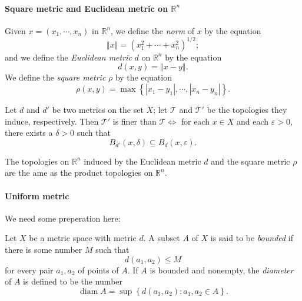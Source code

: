 \paragraph{Square metric and Euclidean metric on \( \mathbb{R}^n \)}

\begin{definition}
  Given \( x = (x_1, \cdots, x_n) \) in \( \mathbb{R}^n \), we define the \emph{norm} of \( x \) by the equation
  \[
    \left\Vert x \right\Vert = (x_1^2 + \cdots + x^2_n)^{1/2};
  \]
  and we define the \emph{Euclidean metric} \( d \) on \( \mathbb{R}^n \) by the equation
  \[
    d(x, y) = \left\Vert x - y \right\Vert.
  \]
  We define the \emph{square metric} \( \rho \) by the equation
  \[
    \rho(x, y) = \max \left\lbrace \left\vert x_1 - y_1 \right\vert, \cdots, \left\vert x_n - y_n \right\vert \right\rbrace.
  \]
\end{definition}

\begin{lemma}
  Let \( d \) and \( d' \) be two metrics on the set \( X \); let \( \mathcal{T} \) and \( \mathcal{T}' \) be the topologies they induce, respectively.
  Then \( \mathcal{T}' \) is finer than \( \mathcal{T} \iff \) for each \( x \in X \) and each \( \varepsilon > 0 \), there exists a \( \delta > 0 \) such that
  \[
    B_{d'}(x, \delta) \subseteq B_d(x, \varepsilon).
  \]
\end{lemma}

\begin{theorem}
  The topologies on \( \mathbb{R}^n \) induced by the Euclidean metric \( d \) and the square metric \( \rho \) are the ame as the product topologies on \( \mathbb{R}^n \).
\end{theorem}

\paragraph{Uniform metric}

We need some preperation here:

\begin{definition}
  Let \( X \) be a metric space with metric \( d \).
  A subset \( A \) of \( X \) is said to be \emph{bounded} if there is some number \( M \) such that
  \[
    d(a_1, a_2) \leq M
  \]
  for every pair \( a_1, a_2 \) of points of \( A \).
  If \( A \) is bounded and nonempty, the \emph{diameter} of \( A \) is defined to be the number
  \[
    \operatorname{diam} A = \sup \left\lbrace d(a_1, a_2): a_1, a_2 \in A \right\rbrace.
  \]
\end{definition}

